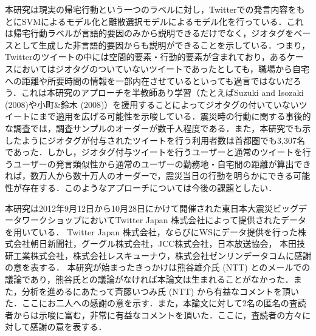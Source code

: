 \documentclass[japanese]{jnlp_1.4}
\begin{document}
本研究は現実の帰宅行動という一つのラベルに対し，Twitterでの発言内容をもとにSVMによるモデル化と離散選択モデルによるモデル化を行っている．これは帰宅行動ラベルが言語的要因のみから説明できるだけでなく，ジオタグをベースとして生成した非言語的要因からも説明ができることを示している．つまり，Twitterのツイートの中には空間的要素・行動的要素が含まれており，あるケースにおいてはジオタグのついていないツイートであったとしても，職場から自宅への距離や所要時間の情報を一部内在させているといっても過言ではないだろう．これは本研究のアプローチを半教師あり学習（たとえばSuzuki and Isozaki (2008)や小町\&鈴木 (2008)）を援用することによってジオタグの付いていないツイートにまで適用を広げる可能性を示唆している．震災時の行動に関する事後的な調査では，調査サンプルのオーダーが数千人程度である．また，本研究でも示したようにジオタグが付与されたツイートを行う利用者数は首都圏でも3,307名であった．しかし，ジオタグ付与ツイートを行うユーザーと通常のツイートを行うユーザーの発言類似性から通常のユーザーの勤務地・自宅間の距離が算出できれば，数万人から数十万人のオーダーで，震災当日の行動を明らかにできる可能性が存在する．このようなアプローチについては今後の課題としたい．


\acknowledgment
本研究は2012年9月12日から10月28日にかけて開催された東日本大震災ビッグデータワークショップにおいてTwitter Japan 株式会社によって提供されたデータを用いている．
Twitter Japan 株式会社，ならびにWSにデータ提供を行った株式会社朝日新聞社，グーグル株式会社，JCC株式会社，日本放送協会，
本田技研工業株式会社，株式会社レスキューナウ，株式会社ゼンリンデータコムに感謝の意を表する．
本研究が始まったきっかけは熊谷雄介氏 (NTT) とのメールでの議論であり，熊谷氏との議論がなければ本論文は生まれることがなかった．また，分析を進めるにあたって斉藤いつみ氏 (NTT) から有益なコメントを頂いた．ここにお二人への感謝の意を示す．また，本論文に対して2名の匿名の査読者からは示唆に富む，非常に有益なコメントを頂いた．ここに，査読者の方々に対して感謝の意を表する．



\end{document}
